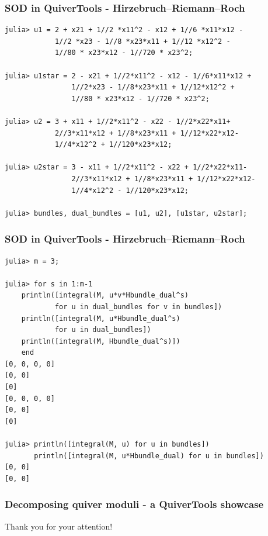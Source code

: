 \documentclass{beamer}
\begin{document}
\begin{frame}[fragile]
    \frametitle{SOD in QuiverTools - Hirzebruch--Riemann--Roch}
\scriptsize{
\begin{lstlisting}
julia> u1 = 2 + x21 + 1//2 *x11^2 - x12 + 1//6 *x11*x12 -
            1//2 *x23 - 1//8 *x23*x11 + 1//12 *x12^2 -
            1//80 * x23*x12 - 1//720 * x23^2;

julia> u1star = 2 - x21 + 1//2*x11^2 - x12 - 1//6*x11*x12 +
                1//2*x23 - 1//8*x23*x11 + 1//12*x12^2 +
                1//80 * x23*x12 - 1//720 * x23^2;

julia> u2 = 3 + x11 + 1//2*x11^2 - x22 - 1//2*x22*x11+
            2//3*x11*x12 + 1//8*x23*x11 + 1//12*x22*x12-
            1//4*x12^2 + 1//120*x23*x12;

julia> u2star = 3 - x11 + 1//2*x11^2 - x22 + 1//2*x22*x11-
                2//3*x11*x12 + 1//8*x23*x11 + 1//12*x22*x12-
                1//4*x12^2 - 1//120*x23*x12;

julia> bundles, dual_bundles = [u1, u2], [u1star, u2star];
\end{lstlisting}
}
\end{frame}

\begin{frame}[fragile]
    \frametitle{SOD in QuiverTools - Hirzebruch--Riemann--Roch}
\scriptsize{
\begin{lstlisting}
julia> m = 3;

julia> for s in 1:m-1
    println([integral(M, u*v*Hbundle_dual^s)
            for u in dual_bundles for v in bundles])
    println([integral(M, u*Hbundle_dual^s)
            for u in dual_bundles])
    println([integral(M, Hbundle_dual^s)])
    end
[0, 0, 0, 0]
[0, 0]
[0]
[0, 0, 0, 0]
[0, 0]
[0]

julia> println([integral(M, u) for u in bundles])
       println([integral(M, u*Hbundle_dual) for u in bundles])
[0, 0]
[0, 0]       
\end{lstlisting}
}
\end{frame}
\begin{frame}
    \frametitle{Decomposing quiver moduli - a QuiverTools showcase}
\begin{center}
    Thank you for your attention!
\end{center}
    

\end{frame}
\end{document}
